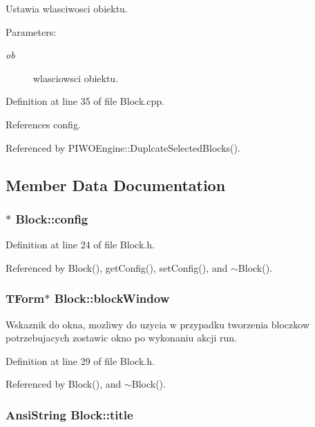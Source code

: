 Ustawia wlasciwosci obiektu. \begin{Desc}
\item[Parameters:]
\begin{description}
\item[{\em ob}]wlasciowsci obiektu. \end{description}
\end{Desc}


Definition at line 35 of file Block.cpp.

References config.

Referenced by PIWOEngine::DuplcateSelectedBlocks().

\subsection{Member Data Documentation}
\hypertarget{classBlock_0f49dcd75a7694f73558ac602b2b3d1f}{
\subsubsection[config]{$\ast$ {\bf Block::config}}}
\label{classBlock_0f49dcd75a7694f73558ac602b2b3d1f}




Definition at line 24 of file Block.h.

Referenced by Block(), getConfig(), setConfig(), and $\sim$Block().\hypertarget{classBlock_64bbe660cd95004706c7f5158d8e270b}{
\subsubsection[blockWindow]{\setlength{\rightskip}{0pt plus 5cm}TForm$\ast$ {\bf Block::blockWindow}}}
\label{classBlock_64bbe660cd95004706c7f5158d8e270b}


Wskaznik do okna, mozliwy do uzycia w przypadku tworzenia bloczkow potrzebujacych zostawic okno po wykonaniu akcji run. 

Definition at line 29 of file Block.h.

Referenced by Block(), and $\sim$Block().\hypertarget{classBlock_9c89fafbe64236bc46ade38d458712b1}{
\subsubsection[title]{\setlength{\rightskip}{0pt plus 5cm}AnsiString {\bf Block::title}}}
\label{classBlock_9c89fafbe64236bc46ade38d458712b1}


